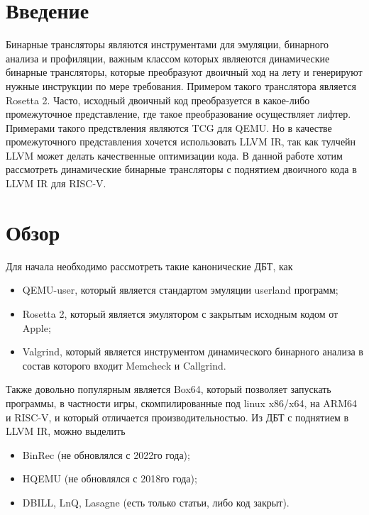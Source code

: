 
\section{Введение}
Бинарные трансляторы являются инструментами для эмуляции, бинарного анализа и профиляции, важным классом которых являеются динамические бинарные трансляторы, которые преобразуют двоичный ход на лету и генерируют нужные инструкции по мере требования. Примером такого транслятора является Rosetta 2. Часто, исходный двоичный код преобразуется в какое-либо промежуточное представление, где такое преобразование осуществляет лифтер. Примерами такого предствления являются TCG для QEMU. Но в качестве промежуточного представления хочется использовать LLVM IR, так как тулчейн LLVM может делать качественные оптимизации кода. В данной работе хотим рассмотреть динамические бинарные трансляторы с поднятием двоичного кода в LLVM IR для RISC-V.
\section{Обзор}
Для начала необходимо рассмотреть такие канонические ДБТ, как
\begin{itemize}
    \item QEMU-user, который является стандартом эмуляции userland программ;
    \item Rosetta 2, который является эмулятором с закрытым исходным кодом от Apple;
    \item Valgrind, который является инструментом динамического бинарного анализа в состав которого входит Memcheck и Callgrind.
\end{itemize}

Также довольно популярным является Box64, который позволяет запускать программы, в частности игры, скомпилированные под linux x86/x64, на ARM64 и RISC-V, и который отличается производительностью.
Из ДБТ с поднятием в LLVM IR, можно выделить
\begin{itemize}
    \item BinRec (не обновлялся с 2022го года);
    \item HQEMU (не обновлялся с 2018го года);
    \item DBILL, LnQ, Lasagne (есть только статьи, либо код закрыт).
\end{itemize}


